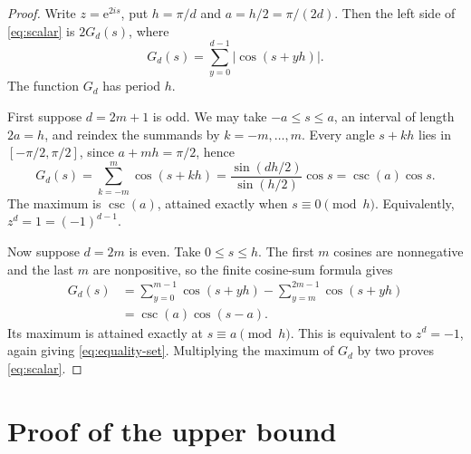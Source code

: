 \documentclass[11pt]{article}
\theoremstyle{remark}
\newcommand{\e}{\mathrm e}
\begin{document}
\begin{proof}
Write \(z=\e^{2is}\), put
\(
h=\pi/d
\)
and
\(
a=h/2=\pi/(2d)
\).
Then the left side of \eqref{eq:scalar} is \(2G_d(s)\), where
\[
  G_d(s)=\sum_{y=0}^{d-1}\lvert\cos(s+yh)\rvert.
\]
The function \(G_d\) has period \(h\).

First suppose \(d=2m+1\) is odd.  We may take \(-a\leq s\leq a\),
an interval of length \(2a=h\), and reindex the summands by
\(k=-m,\ldots,m\).  Every angle \(s+kh\) lies in
\([-\pi/2,\pi/2]\), since \(a+mh=\pi/2\), hence
\[
  G_d(s)
  =
  \sum_{k=-m}^{m}\cos(s+kh)
  =
  \frac{\sin(dh/2)}{\sin(h/2)}\cos s
  =
  \csc(a)\cos s.
\]
The maximum is \(\csc(a)\), attained exactly when
\(s\equiv0\pmod h\).  Equivalently, \(z^d=1=(-1)^{d-1}\).

Now suppose \(d=2m\) is even.  Take \(0\leq s\leq h\).  The first
\(m\) cosines are nonnegative and the last \(m\) are nonpositive, so
the finite cosine-sum formula gives
\begin{align*}
  G_d(s)
  &=
  \sum_{y=0}^{m-1}\cos(s+yh)
  -
  \sum_{y=m}^{2m-1}\cos(s+yh)\\
  &=
  \csc(a)\cos(s-a).
\end{align*}
Its maximum is attained exactly at
\(s\equiv a\pmod h\).  This is equivalent to \(z^d=-1\), again
giving \eqref{eq:equality-set}.  Multiplying the maximum of \(G_d\)
by two proves \eqref{eq:scalar}.
\end{proof}

\section{Proof of the upper bound}
\end{document}
